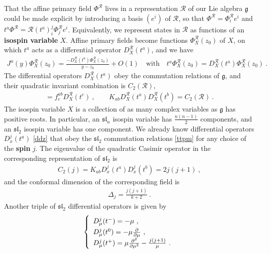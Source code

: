 \documentclass[12pt, a4paper, notitlepage, twoside]{report}
\numberwithin{equation}{section}
\theoremstyle{break}
\begin{document}
That the affine primary field $\Phi^\mathcal{R}$ lives in a representation $\mathcal{R}$ of our Lie algebra $\mathfrak{g}$ could be made explicit by introducing  a basis $(e^i)$ of $\mathcal{R}$, so that $\Phi^{\mathcal{R}} = \Phi^{\mathcal{R}}_ie^i$ and $t^a \Phi^{\mathcal{R}} = \mathcal{R}(t^a)_i^j \Phi^{\mathcal{R}}_je^i$.
Equivalently, we represent states in $\mathcal{R}$ 
as functions of an \textbf{\boldmath isospin variable} $X$. 
Affine primary fields become functions $\Phi^\mathcal{R}_X(z_0)$ of $X$, on which $t^a$ acts as a differential operator $D_X^\mathcal{R}(t^a)$, 
and we have
\begin{align}
 J^a(y)\Phi^\mathcal{R}_X(z_0) = \frac{-D^\mathcal{R}_X(t^a)\Phi^\mathcal{R}_X(z_0)}{y-z_0}+O(1)\quad \text{with} \quad t^a \Phi^\mathcal{R}_X(z_0) = D_X^\mathcal{R}(t^a) \Phi^\mathcal{R}_X(z_0)\ .
\label{jprx}
\end{align}
The differential operators $D_X^\mathcal{R}(t^a)$ obey the commutation relations of $\mathfrak{g}$, and their quadratic invariant combination is $C_2(\mathcal{R})$,
\begin{align}
[D_X^\mathcal{R}(t^a),D_X^\mathcal{R}(t^b)] = f^{ab}_c D_X^\mathcal{R}(t^c)\ , \qquad K_{ab} D_X^\mathcal{R}(t^a)D_X^\mathcal{R}(t^b) = C_2(\mathcal{R})\ .
\label{dta}
\end{align}
The isospin variable $X$ is a collection of as many complex variables as $\mathfrak{g}$ has positive roots.
In particular, an $\mathfrak{sl}_n$ isospin variable has $\frac{n(n-1)}{2}$ components, and an $\mathfrak{sl}_2$ isospin variable has one component.
We already know differential operators $D^j_x(t^a)$ \eqref{ddz} that 
obey the $\mathfrak{sl}_2$ commutation relations \eqref{ttpm} for any choice of the 
\textbf{\boldmath spin} $j$.
The eigenvalue of the quadratic Casimir operator in the corresponding representation of $\mathfrak{sl}_2$ is
\begin{align}
 C_2(j) =  K_{ab}D_x^j(t^a)D_x^j(t^b) = 2j(j+1)\ ,
\end{align}
and the conformal dimension of the corresponding field is
\begin{align}
 \Delta_j =\frac{j(j+1)}{k+2}\ .
\label{dj}
\end{align}
Another triple of $\mathfrak{sl}_2$ differential operators is given by 
\begin{align}
\renewcommand{\arraystretch}{1.3}
\left\{\begin{array}{l}  
 D_\mu^j(t^-) = -\mu \ , \\  D_\mu^j(t^0) = -\mu{\frac{\partial}{\partial \mu}} \ , \\ D_\mu^j(t^+) = \mu\frac{\partial^2}{\partial\mu^2} -\frac{j(j+1)}{\mu}\ . \end{array}\right. 
\label{mub}
\end{align}
\end{document}
